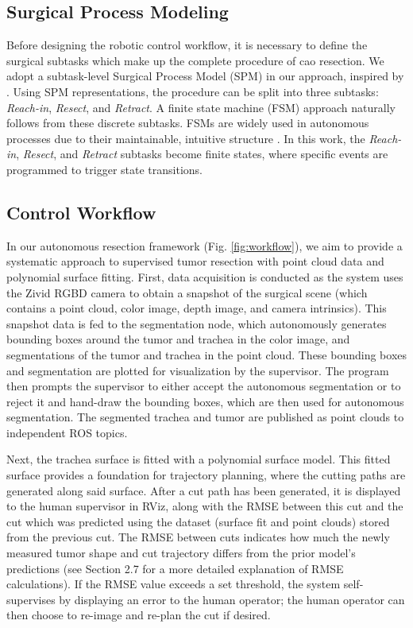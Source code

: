 \subsection{Surgical Process Modeling}
Before designing the robotic control workflow, it is necessary to define the surgical subtasks which make up the complete procedure of \gls{cao} resection. We adopt a subtask-level Surgical Process Model (SPM) in our approach, inspired by \cite{Nagy2018}. Using SPM representations, the procedure can be split into three subtasks: \textit{Reach-in}, \textit{Resect}, and \textit{Retract}. A finite state machine (FSM) approach naturally follows from these discrete subtasks. FSMs are widely used in autonomous processes due to their maintainable, intuitive structure \cite{FSMs}. In this work, the \textit{Reach-in}, \textit{Resect}, and \textit{Retract} subtasks become finite states, where specific events are programmed to trigger state transitions.




\subsection{Control Workflow}


In our autonomous resection framework (Fig. \ref{fig:workflow}), we aim to provide a systematic approach to supervised tumor resection with point cloud data and polynomial surface fitting. First, data acquisition is conducted as the system uses the Zivid RGBD camera to obtain a snapshot of the surgical scene (which contains a point cloud, color image, depth image, and camera intrinsics). This snapshot data is fed to the segmentation node, which autonomously generates bounding boxes around the tumor and trachea in the color image, and segmentations of the tumor and trachea in the point cloud. These bounding boxes and segmentation are plotted for visualization by the supervisor. The program then prompts the supervisor to either accept the autonomous segmentation or to reject it and hand-draw the bounding boxes, which are then used for autonomous segmentation. The segmented trachea and tumor are published as point clouds to independent ROS topics. 

Next, the trachea surface is fitted with a polynomial surface model. This fitted surface provides a foundation for trajectory planning, where the cutting paths are generated along said surface. After a cut path has been generated, it is displayed to the human supervisor in RViz, along with the RMSE between this cut and the cut which was predicted using the dataset (surface fit and point clouds) stored from the previous cut. The RMSE between cuts indicates how much the newly measured tumor shape and cut trajectory differs from the prior model's predictions (see Section 2.7 for a more detailed explanation of RMSE calculations). If the RMSE value exceeds a set threshold, the system self-supervises by displaying an error to the human operator; the human operator can then choose to re-image and re-plan the cut if desired. 



